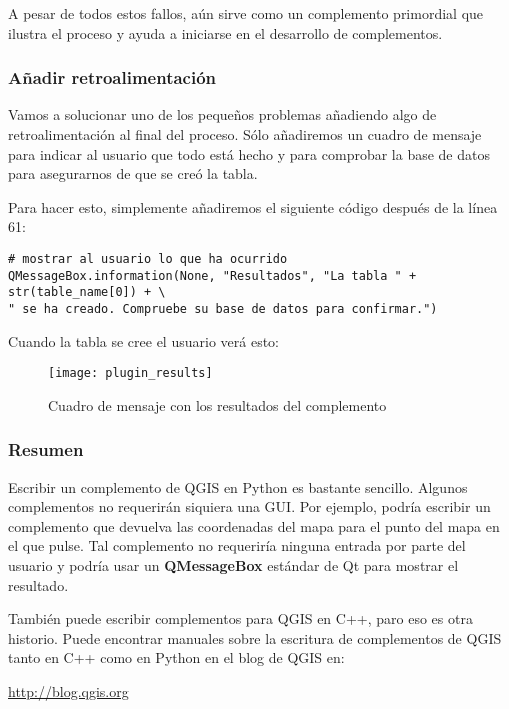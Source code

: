 A pesar de todos estos fallos, aún sirve como un complemento primordial que ilustra el proceso y ayuda 
a iniciarse en el desarrollo de complementos.

\subsubsection{Añadir retroalimentación}

Vamos a solucionar uno de los pequeños problemas añadiendo algo de retroalimentación al final del 
proceso. Sólo añadiremos un cuadro de mensaje para indicar al usuario que todo está hecho y para comprobar 
la base de datos para asegurarnos de que se creó la tabla.

Para hacer esto, simplemente añadiremos el siguiente código después de la línea 61:

\begin{verbatim}
# mostrar al usuario lo que ha ocurrido
QMessageBox.information(None, "Resultados", "La tabla " + str(table_name[0]) + \
" se ha creado. Compruebe su base de datos para confirmar.")
\end{verbatim}

Cuando la tabla se cree el usuario verá esto:

\begin{figure}[ht]
\begin{center}
  \caption{Cuadro de mensaje con los resultados del complemento}\label{fig:plugin_results}\smallskip
  \texttt{[image: plugin\_results]}
\end{center}
\end{figure}

\subsubsection{Resumen}
Escribir un complemento de QGIS en Python es bastante sencillo. Algunos complementos no requerirán 
siquiera una GUI. Por ejemplo, podría escribir un complemento que devuelva las coordenadas del mapa para el 
punto del mapa en el que pulse. Tal complemento no requeriría ninguna entrada por parte del usuario y podría 
usar un \textbf{QMessageBox} estándar de Qt para mostrar el resultado.

También puede escribir complementos para QGIS en C++, paro eso es otra historio. Puede encontrar manuales sobre 
la escritura de complementos de QGIS tanto en C++ como en Python en el blog de QGIS en:

\begin{center}
  \url{http://blog.qgis.org} 
\end{center}


